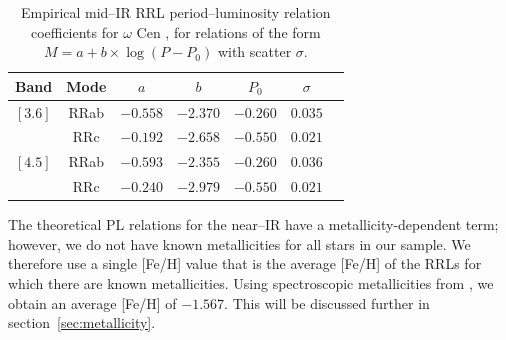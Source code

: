 \documentclass[a4paper,fleqn,usenatbib]{mnras}
\begin{document}
\begin{table}
\centering
\caption{Empirical mid--IR RRL period--luminosity relation coefficients for $\omega$ Cen \citep{2015arXiv150507858N}, for relations of the form $M = a + b \times \log (P - P_0)$ with scatter $\sigma$.} 
\label{tab:pl_table_m4}
\begin{tabular}{l||c|c|c|c|c|r} 
\hline \hline
Band & Mode & $a$ & $b$ & $P_0$ & $\sigma$ \\
\hline
$[3.6]$ & RRab & $-0.558$ & $-2.370$ & $-0.260$ & $0.035$ \\
            & RRc & $-0.192$ & $-2.658$ & $-0.550$ & $0.021$ \\
$[4.5]$ & RRab & $-0.593$ & $-2.355$ & $-0.260$ & $0.036$ \\
            & RRc & $-0.240$ & $-2.979$ & $-0.550$ & $0.021$ \\ 
            \hline
\end{tabular}
\end{table}


The theoretical PL relations for the near--IR have a metallicity-dependent term; however, we do not have known metallicities for all stars in our sample. We therefore use a single [Fe/H] value that is the average [Fe/H] of the RRLs for which there are known metallicities. Using spectroscopic metallicities from \citet{2006ApJ...640L..43S}, we obtain an average [Fe/H] of $-1.567$. This will be discussed further in section~\ref{sec:metallicity}.

\end{document}
